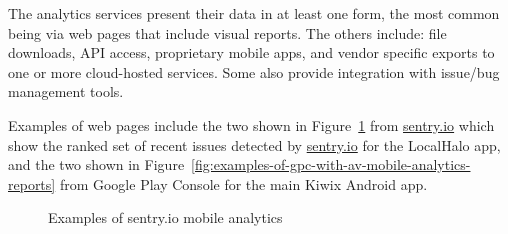 The analytics services present their data in at least one form, the most common being via web pages that include visual reports. The others include: file downloads, API access, proprietary mobile apps, and vendor specific exports to one or more cloud-hosted services. Some also provide integration with issue/bug management tools.

Examples of web pages include the two shown in Figure~\ref{fig:examples-of-sentry-io-mobile-analytics-reports} from \href{https://sentry.io/}{sentry.io} which show the ranked set of recent issues detected by \href{https://sentry.io/}{sentry.io} for the LocalHalo app, and the two shown in Figure~\ref{fig:examples-of-gpc-with-av-mobile-analytics-reports} from Google Play Console for the main Kiwix Android app. 

\begin{figure}
    \centering
    \qquad
    \caption{Examples of sentry.io mobile analytics}
    \label{fig:examples-of-sentry-io-mobile-analytics-reports}
\end{figure}

